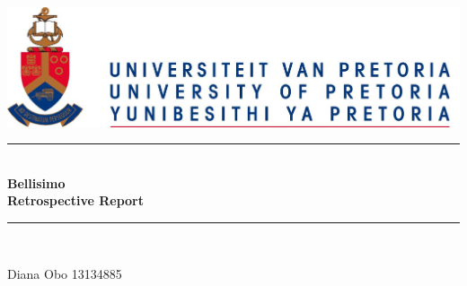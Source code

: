 \documentclass[12pt]{article}
\begin{document}
\begin{titlepage}
	
	\begin{center}
		\includegraphics[scale=1]{diagrams/up.png}\\ [1cm]
		\rule{\linewidth}{0.5mm} \\[0.4cm]
		{ \huge \bfseries Bellisimo
			 \\ [0.5cm]Retrospective Report}\\[0.5cm]
		\rule{\linewidth}{0.5mm} \\[0.4cm]	
		
		\begin{minipage}{0.4\textwidth}
			\begin{flushleft} \large
				Diana {Obo}
				13134885
			\end{flushleft}
		\end{minipage}
		
	\end{center}
\end{titlepage}
\end{document}

